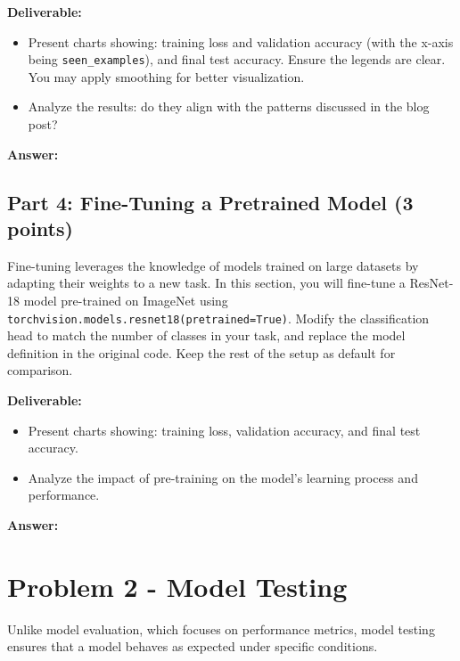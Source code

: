 \documentclass[11pt, oneside]{article}   	%
\begin{document}
\noindent\textbf{Deliverable:}
\begin{itemize}
    \item Present charts showing: training loss and validation accuracy (with the x-axis being \texttt{seen\_examples}), and final test accuracy. Ensure the legends are clear. You may apply smoothing for better visualization. 
    \item Analyze the results: do they align with the patterns discussed in the blog post?
\end{itemize}

\begin{answerbox} \textbf{Answer:} \vspace*{1cm}

\end{answerbox}

\subsection*{Part 4: Fine-Tuning a Pretrained Model (3 points)}
Fine-tuning leverages the knowledge of models trained on large datasets by adapting their weights to a new task. In this section, you will fine-tune a ResNet-18 model pre-trained on ImageNet using \texttt{torchvision.models.resnet18(pretrained=True)}. Modify the classification head to match the number of classes in your task, and replace the model definition in the original code. Keep the rest of the setup as default for comparison.


\noindent\textbf{Deliverable:}
\begin{itemize}
    \item Present charts showing: training loss, validation accuracy, and final test accuracy.
    \item Analyze the impact of pre-training on the model's learning process and performance.
    
\end{itemize}

\begin{answerbox} \textbf{Answer:} \vspace*{1cm}

\end{answerbox}


\clearpage

\section*{Problem 2 - Model Testing}
Unlike model evaluation, which focuses on performance metrics, model testing ensures that a model behaves as expected under specific conditions.
\end{document}
